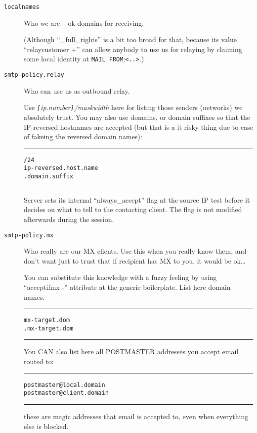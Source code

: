 \begin{description}
\item[\tt localnames] \mbox{}

Who we are -- ok domains for receiving.

(Although ``\_full\_rights'' is a bit too broad for that, because
 its value ``relaycustomer +'' can allow anybody to use us for relaying
 by claiming some local identity at {\tt MAIL FROM}:\verb/<..>/.)


\item[\tt smtp-policy.relay] \mbox{}

Who can use us as outbound relay.

Use  {\em\verb/[/ip.number\verb/]//maskwidth}  here for
listing those senders (networks) we absolutely trust.
You may also use domains, or domain suffixes so that the IP-reversed
hostnames are accepted (but that is a it risky thing due to ease of
fakeing the reversed domain names):

\begin{alltt}\medskip\hrule\medskip
[11.22.33.00]/24
ip-reversed.host.name
.domain.suffix
\medskip\hrule\end{alltt}\medskip

Server sets its internal ``always\_accept'' flag at the source IP test
before it decides on what to tell to the contacting client.
The flag is not modified afterwards during the session.


\item[\tt smtp-policy.mx] \mbox{}

Who really are our MX clients.
Use this when you really know them, and don't want just to trust
that if recipient has MX to you, it would be ok\ldots

You can substitute this knowledge with a fuzzy feeling by using
``acceptifmx -'' attribute at the generic boilerplate.
List here domain names. 
\begin{alltt}\medskip\hrule\medskip
 mx-target.dom
 .mx-target.dom
\medskip\hrule\end{alltt}\medskip

You CAN also list here all POSTMASTER addresses you accept email routed to: 

\begin{alltt}\medskip\hrule\medskip
 postmaster@local.domain
 postmaster@client.domain
\medskip\hrule\end{alltt}\medskip

these are magic addresses that email is accepted to, even when everything
else is blocked. 


\end{description}
